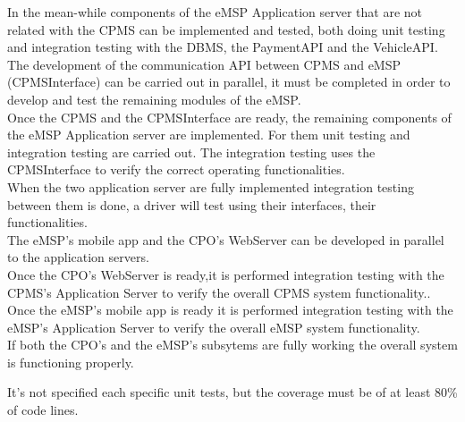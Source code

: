 In the mean-while components of the eMSP Application server that are not related with the CPMS can be implemented and tested, both doing unit testing and integration testing with the DBMS, the PaymentAPI and the VehicleAPI.\\

The development of the communication API between CPMS and eMSP (CPMSInterface) can be carried out in parallel, it must be completed in order to develop and test the remaining modules of the eMSP.\\

Once the CPMS and the CPMSInterface are ready, the remaining components of the eMSP Application server are implemented. For them unit testing and integration testing are carried out. The integration testing uses the CPMSInterface to verify the correct operating functionalities.\\

When the two application server are fully implemented integration testing between them is done, a driver will test using their interfaces, their functionalities.\\

The eMSP's mobile app and the CPO's WebServer can be developed in parallel to the application servers.\\
Once the CPO's WebServer is ready,it is performed integration testing with the CPMS's Application Server to verify the overall CPMS system functionality..
Once the eMSP's mobile app is ready it is performed integration testing with the eMSP's Application Server to verify the overall eMSP system functionality.\\
If both the CPO's and the eMSP's subsytems are fully working the overall system is functioning properly.


It's not specified each specific unit tests, but the coverage must be of at least 80\% of code lines.
